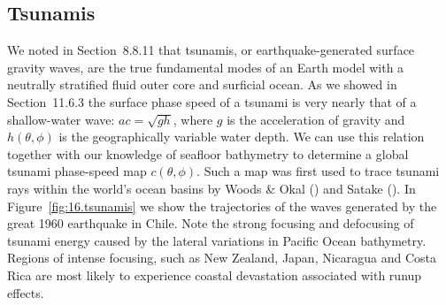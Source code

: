 \renewcommand{\thesubsection}{$\!\!\!\raise1.3ex\hbox{$\star$}\!\!$
\arabic{chapter}.\arabic{section}.\arabic{subsection}}
\subsection{Tsunamis}
%
\renewcommand{\thesubsection}{\arabic{chapter}.\arabic{section}.\arabic{subsection}}

We noted in Section~8.8.11 that tsunamis, or
earthquake-generated surface gravity waves,
are the true fundamental modes of an Earth model
with a neutrally stratified fluid outer core and
surficial ocean.  As we showed in Section~11.6.3
the surface phase speed of a tsunami is very nearly that of a
shallow-water wave: $ac=\sqrt{gh}$, where $g$ is the acceleration
of gravity and $h(\theta,\phi)$ is the geographically
variable water depth.  We can use this relation
together with our knowledge of seafloor bathymetry to determine a
global tsunami phase-speed map $c(\theta,\phi)$.  Such a map was
first used to trace tsunami rays within the world's ocean basins
by Woods \& Okal (\citeyear{woods&okal87}) and Satake (\citeyear{satake88}).
In Figure~\ref{fig:16.tsunamis} we show the trajectories of
the waves generated by the great 1960 earthquake in Chile.
%
Note the strong focusing and defocusing of tsunami energy
caused by the lateral variations in Pacific Ocean bathymetry.
Regions of intense focusing, such as New Zealand, Japan, Nicaragua
and Costa Rica are most likely to experience coastal
devastation associated with runup effects.

